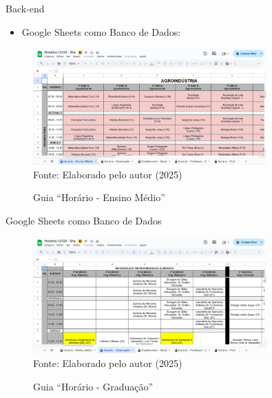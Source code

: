 \begin{frame}{Back-end}
    \begin{itemize}
        \item Google Sheets como Banco de Dados: \vspace{0.5cm}
    \end{itemize}
    \begin{figure}
        \centering
        \vspace{-0.8cm}
        \caption{Guia ``Horário - Ensino Médio''}
        \vspace{-0.2cm}
        \includegraphics[width=0.8\textwidth]{figuras/plan-1.png}
        \\ %
        \small Fonte: Elaborado pelo autor (2025)
    \end{figure}
\end{frame}

\begin{frame}{Google Sheets como Banco de Dados}
    \begin{figure}
        \centering
        \vspace{-0.5cm}
        \caption{Guia ``Horário - Graduação''}
        \vspace{-0.2cm}
        \includegraphics[width=0.8\textwidth]{figuras/plan-2.png}
        \\ %
        \small Fonte: Elaborado pelo autor (2025)
    \end{figure}
\end{frame}

